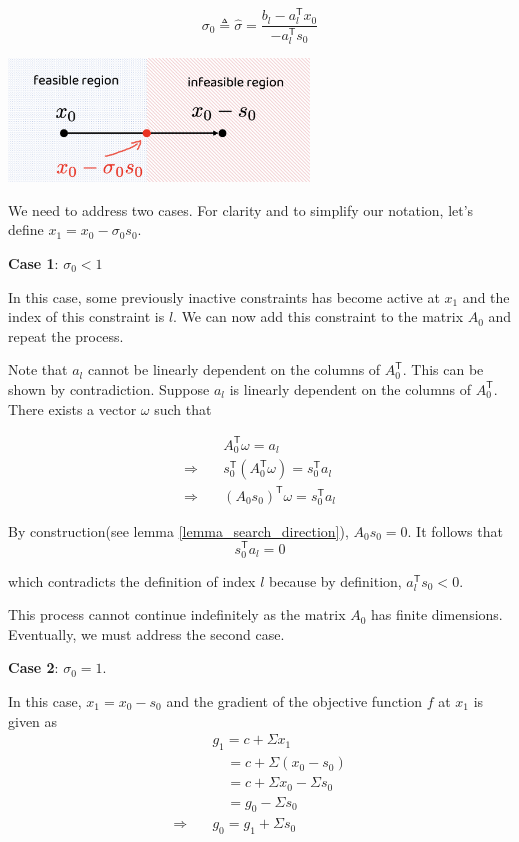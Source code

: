 \documentclass[letterpaper, oneside]{book}
\theoremstyle{definition}
\theoremstyle{remark}
\begin{document}
\begin{displaymath}
	\sigma_0 \triangleq \hat{\sigma} = \frac{b_l - a_l^{\mathsf{T}}x_0}{-a_l^{\mathsf{T}}s_0}
\end{displaymath}

\begin{center}
	\includegraphics[width=0.6\textwidth]{maximum_step_size.png}
\end{center}

We need to address two cases. For clarity and to simplify our notation, let's define $x_1 = x_0 - \sigma_0 s_0$.

\textbf{Case 1}: $\sigma_0 < 1$

In this case, some previously inactive constraints has become active at $x_1$ and the index of this constraint is $l$. We can now add this constraint to the matrix $A_0$ and repeat the process. 

Note that $a_l$ cannot be linearly dependent on the columns of $A_0^{\mathsf{T}}$. This can be shown by contradiction. Suppose $a_l$ is linearly dependent on the columns of $A_0^{\mathsf{T}}$. There exists a vector $\omega$ such that

\begin{align*}
	& A_0^{\mathsf{T}} \omega  = a_l \\
	\Rightarrow \quad & s_0^{\mathsf{T}}(A_0^{\mathsf{T}} \omega) = s_0^{\mathsf{T}} a_l \\
	\Rightarrow \quad & (A_0 s_0)^{\mathsf{T}} \omega  = s_0^{\mathsf{T}} a_l
\end{align*}

By construction(see lemma \ref{lemma_search_direction}), $A_0 s_0 = 0$. It follows that
\[ 
	s_0^{\mathsf{T}} a_l = 0
\] 

which contradicts the definition of index $l$ because by definition, $a_l^{\mathsf{T}}s_0 < 0$.

This process cannot continue indefinitely as the matrix $A_0$ has finite dimensions. Eventually, we must address the second case.

\textbf{Case 2}: $\sigma_0 = 1$.

In this case, $x_1 = x_0 - s_0$ and the gradient of the objective function $f$ at $x_1$ is given as
\begin{align*}
	& g_1 = c + \Sigma x_1 \\
	& \quad = c + \Sigma (x_0 - s_0) \\
	& \quad = c + \Sigma x_0 - \Sigma s_0 \\
	& \quad = g_0 - \Sigma s_0 \\	
	\Rightarrow \quad & g_0  =  g_1 + \Sigma s_0
\end{align*}
\end{document}
